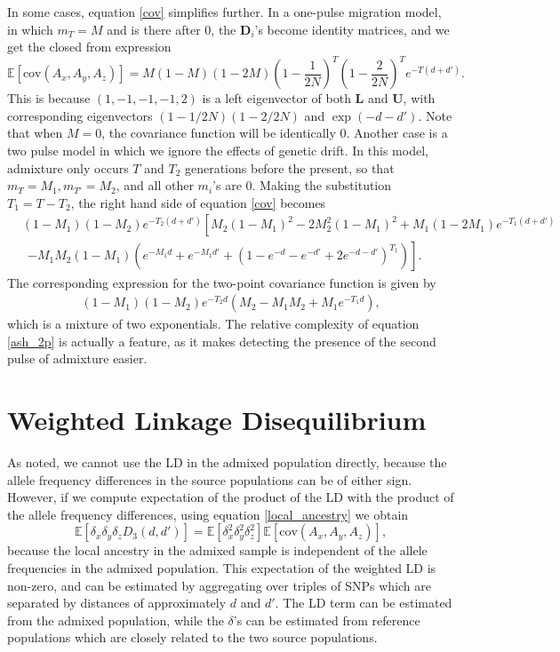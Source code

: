 In some cases, equation \ref{cov} simplifies further. In a one-pulse migration model, in which $m_T=M$ and is there after 0, the $\mathbf{D}_i$'s become identity matrices, and we get the closed from expression 
$$
	\mathbb{E}[\text{cov}(A_x,A_y,A_z)] = M(1-M)(1-2M)\left(1-\frac{1}{2N}\right)^T\left(1-\frac{2}{2N}\right)^Te^{-T(d+d')}.
$$
This is because $(1,-1,-1,-1,2)$ is a left eigenvector of both $\mathbf{L}$ and $\mathbf{U}$, with corresponding eigenvectors $(1-1/2N)(1-2/2N)$ and $\exp(-d-d')$. Note that when $M=0$, the covariance function will be identically 0. Another case is a two pulse model in which we ignore the effects of genetic drift. In this model, admixture only occurs $T$ and $T_2$ generations before the present, so that $m_T=M_1,m_{T'}=M_2$, and all other $m_i$'s are 0. Making the substitution $T_1=T-T_2$, the right hand side of equation \ref{cov} becomes 
\begin{align}
		&(1-M_1)(1-M_2)e^{-T_2(d+d')}\left[M_2(1-M_1)^2-2M_2^2(1-M_1)^2+M_1(1-2M_1)e^{-T_1(d+d')}\right.\nonumber\\
		&\ \ \left.-M_1M_2(1-M_1)\left(e^{-M_1d}+e^{-M_1 d'}+\left(1-e^{-d}-e^{-d'}+2e^{-d-d'}\right)^{T_1}\right) \right].
\label {ash_2p}
\end{align} 
The corresponding expression for the two-point covariance function is given by 
\begin{align}
		(1-M_1)(1-M_2)e^{-T_2d}\left(M_2-M_1M_2+M_1e^{-T_1d}\right),
\label{alder_2p}
\end{align} 
which is a mixture of two exponentials. The relative complexity of equation \ref{ash_2p} is actually a feature, as it makes detecting the presence of the second pulse of admixture easier.
\section{Weighted Linkage Disequilibrium}
As \cite{loh2013inferring} noted, we cannot use the LD in the admixed population directly, because the allele frequency differences in the source populations can be of either sign. However, if we compute expectation of the product of the LD with the product of the allele frequency differences, using equation \ref{local_ancestry} we obtain
$$
\mathbb{E}\left[\delta_x\delta_y\delta_z D_3(d,d')\right]=\mathbb{E}[\delta_x^2\delta_y^2\delta_z^2]\mathbb{E}[\text{cov}(A_x,A_y,A_z)],
$$
because the local ancestry in the admixed sample is independent of the allele frequencies in the admixed population. This expectation of the weighted LD is non-zero, and can be estimated by aggregating over triples of SNPs which are separated by distances of approximately $d$ and $d'$. The LD term can be estimated from the admixed population, while the $\delta$'s can be estimated from reference populations which are closely related to the two source populations. 

